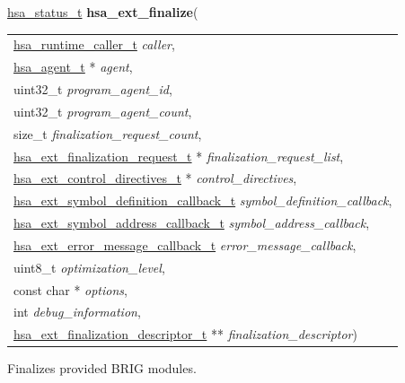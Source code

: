 \documentclass[final]{book}
\newcommand{\hsaarg}[1]{\textit{#1}}
\begin{document}
\noindent\begin{tcolorbox}[breakable,nobeforeafter,colframe=white,colback=lightgray,left=0mm]
\hyperlink{group__status_1gad755322e7ff95456520e8abdbe90d225}{hsa_status_t} \hypertarget{group__FinalizerCoreApi_1gad42cf738ed29770a7cec53fc13009a93}{\textbf{hsa_ext_finalize}}(
\vspace{-3.5mm}\begin{longtable}{@{}p{\textwidth}}
\hspace{1.7em}\hyperlink{group__RuntimeCommon_1ga7d9b1191602415f5dd3893985cc93826}{hsa_runtime_caller_t} \hsaarg{caller},\\
\hspace{1.7em}\hyperlink{group__topology_1gab8db3fb886332a24acac08ec361e1d86}{hsa_agent_t} * \hsaarg{agent},\\
\hspace{1.7em}uint32_t \hsaarg{program_agent_id},\\
\hspace{1.7em}uint32_t \hsaarg{program_agent_count},\\
\hspace{1.7em}size_t \hsaarg{finalization_request_count},\\
\hspace{1.7em}\hyperlink{group__FinalizerCoreApi_1ga670c94fee80740017464110a40775b33}{hsa_ext_finalization_request_t} * \hsaarg{finalization_request_list},\\
\hspace{1.7em}\hyperlink{group__FinalizerCoreApi_1ga40c83573be6c1e21ad46ff8a7edd21b0}{hsa_ext_control_directives_t} * \hsaarg{control_directives},\\
\hspace{1.7em}\hyperlink{group__FinalizerCoreApi_1ga961d2842da110520beda334eedcb2e31}{hsa_ext_symbol_definition_callback_t} \hsaarg{symbol_definition_callback},\\
\hspace{1.7em}\hyperlink{group__FinalizerCoreApi_1gaa0ae3a2a5a88c4b4799d4838da6c571e}{hsa_ext_symbol_address_callback_t} \hsaarg{symbol_address_callback},\\
\hspace{1.7em}\hyperlink{group__FinalizerCoreApi_1gace3d3971c5289675c4f88ce0045db41f}{hsa_ext_error_message_callback_t} \hsaarg{error_message_callback},\\
\hspace{1.7em}uint8_t \hsaarg{optimization_level},\\
\hspace{1.7em}const char * \hsaarg{options},\\
\hspace{1.7em}int \hsaarg{debug_information},\\
\hspace{1.7em}\hyperlink{group__FinalizerCoreApi_1ga891145420d6ee58bf56b59c557101b88}{hsa_ext_finalization_descriptor_t} ** \hsaarg{finalization_descriptor})\end{longtable}

\end{tcolorbox}
Finalizes provided BRIG modules.
\end{document}
